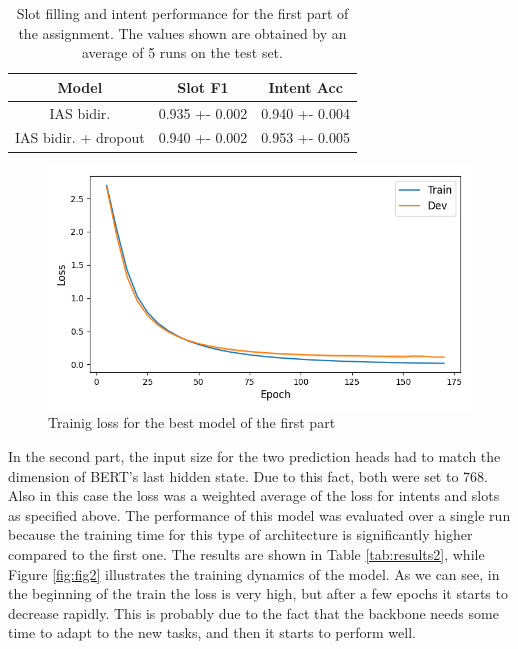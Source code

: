 \documentclass[a4paper]{article}
\begin{document}
\begin{table}[h]
  \centering
  \begin{tabular}{|c|c|c|}
    \hline
    \textbf{Model} & \textbf{Slot F1} & \textbf{Intent Acc} \\
    \hline
    IAS bidir.&  0.935 +- 0.002 & 0.940 +- 0.004 \\
    IAS bidir. + dropout & 0.940 +- 0.002 & 0.953 +- 0.005 \\
    \hline
  \end{tabular}
  \caption{Slot filling and intent performance for the first part of the assignment. The values shown are obtained by an average of 5 runs on the test set.}
  \label{tab:results1}

\end{table}

\begin{figure}[h]
  \includegraphics[width=\linewidth]{./images/plot_1_loss.png}
  \caption{Trainig loss for the best model of the first part}
  \label{fig:fig1}
\end{figure}

In the second part, the input size for the two prediction heads had to match the dimension of BERT’s last hidden state. Due to this fact, both were set to 768.
Also in this case the loss was a weighted average of the loss for intents and slots as specified above. 
The performance of this model was evaluated over a single run because the training time for this type of architecture is significantly higher compared to the first one. The results are shown in Table \ref{tab:results2}, while Figure \ref{fig:fig2} illustrates the training dynamics of the model.
As we can see, in the beginning of the train the loss is very high, but after a few epochs it starts to decrease rapidly. This is probably due to the fact that the backbone needs some time to adapt to the new tasks, and then it starts to perform well.
\end{document}
